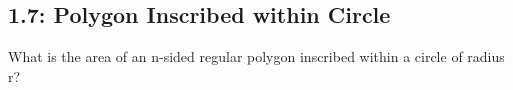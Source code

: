 \documentclass{article}
\begin{document}
\subsection*{1.7: Polygon Inscribed within Circle}
What is the area of an n-sided regular polygon inscribed within a circle of radius r?
\end{document}
